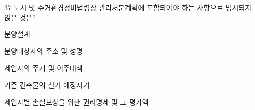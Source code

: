 \begin{question}{37}
도시 및 주거환경정비법령상 관리처분계획에 포함되어야 하는 사항으로 명시되지 않은 것은?
\begin{choices}
  \item 분양설계
  \item 분양대상자의 주소 및 성명
  \item 세입자의 주거 및 이주대책
  \item 기존 건축물의 철거 예정시기
  \item 세입자별 손실보상을 위한 권리명세 및 그 평가액
\end{choices}
\end{question}
